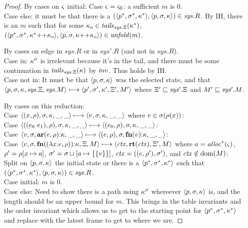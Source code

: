 \begin{proof}
\noindent By cases on $\varsigma$ initial:
Case $\varsigma = \varsigma_0$: a sufficient $m$ is 0.
\\
Case else: it must be that there is a $(\langle p^*,\sigma^*,\kappa^* \rangle,\langle p,\sigma,\kappa \rangle) \in \mathit{sys}.R$.
 By IH, there is an $m$ such that for some 
 $\kappa_o \in \mathit{tails}_{\mathit{sys}.\Xi}(\kappa^*)$,
 $(\langle p^*,\sigma^*,\kappa^* {\tt ++} \kappa_o \rangle,\langle p,\sigma,\kappa {\tt ++} \kappa_o \rangle) \in \mathit{unfold}(m)$.

By cases on edge in $\mathit{sys}.R$ or in $\mathit{sys}'.R$ (and not in $\mathit{sys}.R$).
\\
Case in: $\kappa''$ is irrelevant because it's in the tail, and there must be some continuation in $\mathit{tails}_{\mathit{sys}.\Xi}(\kappa)$ by $\mathit{inv}$.
         Thus holds by IH.
\\
Case not in:
  It must be that $\langle p,\sigma,\kappa \rangle$ was the selected state, and that
  $\langle p,\sigma,\kappa,\mathit{sys}.\Xi,\mathit{sys}.M \rangle \longmapsto \langle p',\sigma',\kappa',\Xi',M' \rangle$ where $\Xi' \sqsubseteq \mathit{sys}'.\Xi$ and $M' \sqsubseteq \mathit{sys}'.M$.

  By cases on this reduction:
\\
  Case $\langle (x,\rho),\sigma,\kappa,\_,\_ \rangle \longmapsto \langle v,\sigma,\kappa,\_,\_ \rangle$ where $v \in \sigma(\rho(x))$:
\\
  Case $\tpl{((\mexpri0\ \mexpri1),\menv),\mstore,\mkont,\_,\_} \stepto \tpl{(\mexpri0,\menv),\mstore,\mkont,\_,\_}$:
\\
  Case $\langle v,\sigma,\mathbf{ar}{}(e,\rho){\tt :} \kappa,\_,\_ \rangle \longmapsto \langle (e,\rho),\sigma,\mathbf{fn}{}(v){\tt :} \kappa,\_,\_ \rangle$:
\\
  Case $\langle v,\sigma,\mathbf{fn}{}((\lambda{} x. e, \rho)){\tt :} \kappa,\Xi,M \rangle \longmapsto \langle \mathit{ctx},\mathbf{rt}(\mathit{ctx}),\Xi',M \rangle$
  where $a = \mathit{alloc}^*(\varsigma)$, $\rho' = \rho[x \mapsto a]$, $\sigma' = \sigma\sqcup[a \mapsto \{ \{ v \} \}]$, $\mathit{ctx} = ((e,\rho'),\sigma')$, and $\mathit{ctx} \notin \text{dom}(M)$:
\\
  Split on $\langle p,\sigma,\kappa \rangle$ the initial state or
           there is a $\langle p^*,\sigma^*,\kappa^* \rangle$ such that $(\langle p^*,\sigma^*,\kappa^* \rangle, \langle p,\sigma,\kappa \rangle) \in \mathit{sys}.R$.
\\
  Case initial: $m$ is 0.
\\
  Case else:
   Need to show there is a path using $\kappa''$ whereever $\langle p,\sigma,\kappa \rangle$ is, and the length should be an upper bound for $m$.
   This brings in the table invariants and the order invariant which allows us to get to the starting point for 
   $\langle p^*,\sigma^*,\kappa^* \rangle$ and replace with the latest frame to get to where we are.
\end{proof}